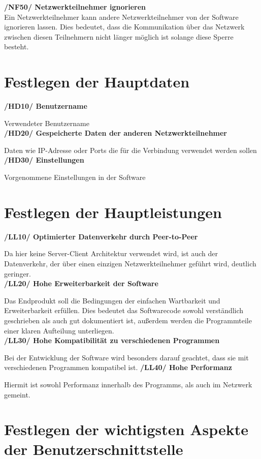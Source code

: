 \documentclass[a4paper,12pt]{scrreprt}
\begin{document}
	\textbf {/NF50/ Netzwerkteilnehmer ignorieren}
	\\Ein Netzwerkteilnehmer kann andere Netzwerkteilnehmer von der Software ignorieren lassen. Dies bedeutet, dass die Kommunikation über das Netzwerk zwischen diesen Teilnehmern nicht länger möglich ist solange diese Sperre besteht.
	
	\section{Festlegen der Hauptdaten}
	\textbf {/HD10/ Benutzername}
	
	Verwendeter Benutzername\\
	\textbf {/HD20/ Gespeicherte Daten der anderen Netzwerkteilnehmer}
	
	Daten wie IP-Adresse oder Ports die für die Verbindung verwendet werden sollen\\
	\textbf {/HD30/ Einstellungen}
	
	Vorgenommene Einstellungen in der Software\\
	
	
	\section{Festlegen der Hauptleistungen}
	
	   \textbf{/LL10/ Optimierter Datenverkehr durch Peer-to-Peer}
		
		Da hier keine Server-Client Architektur verwendet wird, ist auch der Datenverkehr, der über einen einzigen Netzwerkteilnehmer geführt wird, deutlich geringer.\\
		\textbf {/LL20/ Hohe Erweiterbarkeit der Software}
		
		Das Endprodukt soll die Bedingungen der einfachen Wartbarkeit und Erweiterbarkeit erfüllen. Dies bedeutet das Softwarecode sowohl verständlich geschrieben als auch gut dokumentiert ist, außerdem werden die Programmteile einer klaren Aufteilung unterliegen.\\
		\textbf {/LL30/ Hohe Kompatibilität zu verschiedenen Programmen}
		
		Bei der Entwicklung der Software wird besonders darauf geachtet, dass sie mit verschiedenen Programmen kompatibel ist.
		\textbf {/LL40/ Hohe Performanz}
		
		Hiermit ist sowohl Performanz innerhalb des Programms, als auch im Netzwerk gemeint.
		
	\section{Festlegen der wichtigsten Aspekte der Benutzerschnittstelle}
		
\end{document}
